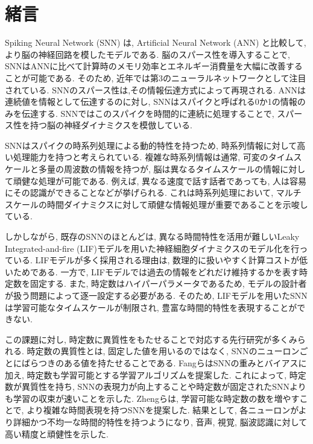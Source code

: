 \section{緒言}
Spiking Neural Network (SNN) は, Artificial Neural Network (ANN) と比較して, より脳の神経回路を模したモデルである\cite{TAVANAEI201947}.
脳のスパース性を導入することで, SNNはANNに比べて計算時のメモリ効率とエネルギー消費量を大幅に改善することが可能である.
そのため, 近年では第3のニューラルネットワークとして注目されている\cite{Henkes2024}.
SNNのスパース性は,その情報伝達方式によって再現される.
ANNは連続値を情報として伝達するのに対し, SNNはスパイクと呼ばれる0か1の情報のみを伝達する.
SNNではこのスパイクを時間的に連続に処理することで, スパース性を持つ脳の神経ダイナミクスを模倣している.

SNNはスパイクの時系列処理による動的特性を持つため, 時系列情報に対して高い処理能力を持つと考えられている\cite{zheng2024temporal}.
複雑な時系列情報は通常, 可変のタイムスケールと多量の周波数の情報を持つが, 脳は異なるタイムスケールの情報に対して頑健な処理が可能である\cite{10.1162/jocn_a_01615}.
例えば, 異なる速度で話す話者であっても, 人は容易にその認識ができることなどが挙げられる.
これは時系列処理において, マルチスケールの時間ダイナミクスに対して頑健な情報処理が重要であることを示唆している.

しかしながら, 既存のSNNのほとんどは, 異なる時間特性を活用が難しいLeaky Integrated-and-fire (LIF)モデルを用いた神経細胞ダイナミクスのモデル化を行っている\cite{dayan2003theoretical}.
LIFモデルが多く採用される理由は, 数理的に扱いやすく計算コストが低いためである.
一方で, LIFモデルでは過去の情報をどれだけ維持するかを表す時定数を固定する.
また, 時定数はハイパーパラメータであるため, モデルの設計者が扱う問題によって逐一設定する必要がある.
そのため, LIFモデルを用いたSNNは学習可能なタイムスケールが制限され, 豊富な時間的特性を表現することができない.

この課題に対し, 時定数に異質性をもたせることで対応する先行研究が多くみられる\cite{10.1145/3407197.3407225}\cite{ParametricSNN}.
時定数の異質性とは, 固定した値を用いるのではなく, SNNのニューロンごとにばらつきのある値を持たせることである.
Fangら\cite{ParametricSNN}はSNNの重みとバイアスに加え, 時定数も学習可能とする学習アルゴリズムを提案した.
これによって, 時定数が異質性を持ち, SNNの表現力が向上することや時定数が固定されたSNNよりも学習の収束が速いことを示した.
Zhengら\cite{zheng2024temporal}は, 学習可能な時定数の数を増やすことで, より複雑な時間表現を持つSNNを提案した.
結果として, 各ニューロンがより詳細かつ不均一な時間的特性を持つようになり, 音声, 視覚, 脳波認識に対して高い精度と頑健性を示した.

